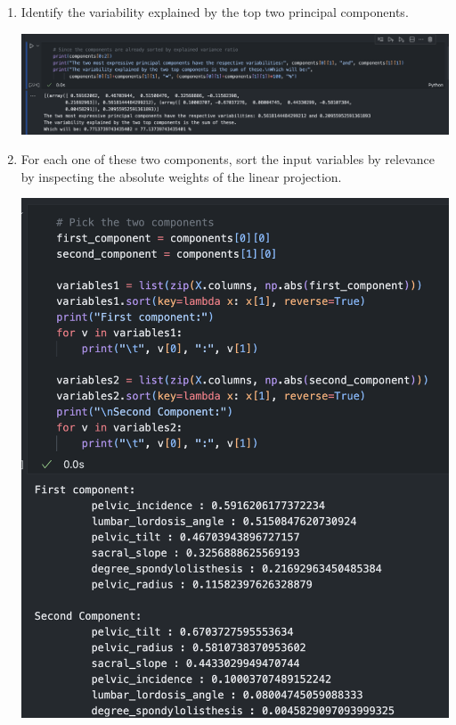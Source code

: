 \documentclass[12pt]{article}
\begin{document}
\begin{enumerate}
    \begin{enumerate}
        \item Identify the variability explained by the top two principal components.
            \begin{center}
                \includegraphics[scale=0.3]{images/code9.png}
            \end{center}
        
        \item For each one of these two components, sort the input variables by relevance by
        inspecting the absolute weights of the linear projection.
    
        \begin{center}
            \includegraphics[scale=0.6]{images/code10.png}
        \end{center}
    \end{enumerate}


\end{enumerate}
\end{document}
